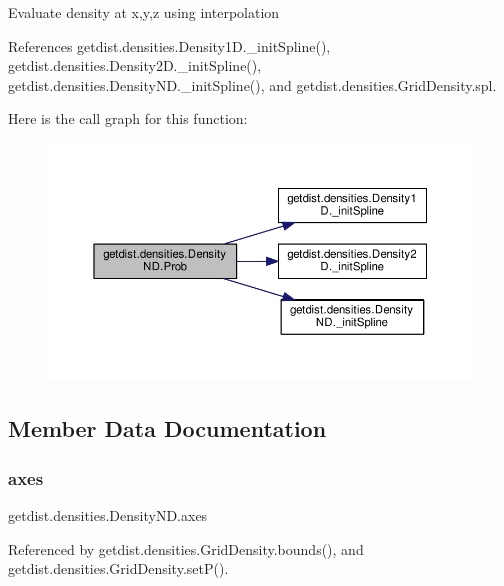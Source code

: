 \begin{DoxyVerb}Evaluate density at x,y,z using interpolation
\end{DoxyVerb}
 

References getdist.\+densities.\+Density1\+D.\+\_\+init\+Spline(), getdist.\+densities.\+Density2\+D.\+\_\+init\+Spline(), getdist.\+densities.\+Density\+N\+D.\+\_\+init\+Spline(), and getdist.\+densities.\+Grid\+Density.\+spl.

Here is the call graph for this function\+:
\nopagebreak
\begin{figure}[H]
\begin{center}
\leavevmode
\includegraphics[width=350pt]{classgetdist_1_1densities_1_1DensityND_a4e43700140c1f543d4b079bb8e4906c3_cgraph}
\end{center}
\end{figure}


\subsection{Member Data Documentation}
\mbox{\label{classgetdist_1_1densities_1_1DensityND_af1d309d831384b23e4c7a9efde25ebfd}} 
\subsubsection{\texorpdfstring{axes}{axes}}
{\footnotesize\ttfamily getdist.\+densities.\+Density\+N\+D.\+axes}



Referenced by getdist.\+densities.\+Grid\+Density.\+bounds(), and getdist.\+densities.\+Grid\+Density.\+set\+P().

